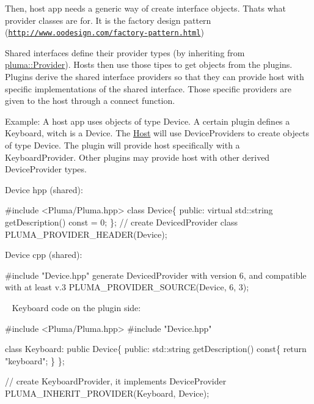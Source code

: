 Then, host app needs a generic way of create interface objects. That\textquotesingle{}s what provider classes are for. It is the factory design pattern (\href{http://www.oodesign.com/factory-pattern.html}{\tt http\+://www.\+oodesign.\+com/factory-\/pattern.\+html})

Shared interfaces define their provider types (by inheriting from \hyperlink{classpluma_1_1_provider}{pluma\+::\+Provider}). Hosts then use those tipes to get objects from the plugins. Plugins derive the shared interface providers so that they can provide host with specific implementations of the shared interface. Those specific providers are given to the host through a connect function.

Example\+: A host app uses objects of type Device. A certain plugin defines a Keyboard, witch is a Device. The \hyperlink{classpluma_1_1_host}{Host} will use Device\+Providers to create objects of type Device. The plugin will provide host specifically with a Keyboard\+Provider. Other plugins may provide host with other derived Device\+Provider types.

Device hpp (shared)\+: 
\begin{DoxyCode}
\textcolor{preprocessor}{#include <Pluma/Pluma.hpp>}
\textcolor{keyword}{class }Device\{
\textcolor{keyword}{public}:
    \textcolor{keyword}{virtual} std::string getDescription() \textcolor{keyword}{const} = 0;
\};
\textcolor{comment}{// create DevicedProvider class}
PLUMA\_PROVIDER\_HEADER(Device);
\end{DoxyCode}


Device cpp (shared)\+: 
\begin{DoxyCode}
\textcolor{preprocessor}{#include "Device.hpp"}
generate DevicedProvider with version 6, and compatible with at least v.3
PLUMA\_PROVIDER\_SOURCE(Device, 6, 3);
\end{DoxyCode}


~\newline
 Keyboard code on the plugin side\+: 
\begin{DoxyCode}
\textcolor{preprocessor}{#include <Pluma/Pluma.hpp>}
\textcolor{preprocessor}{#include "Device.hpp"}

\textcolor{keyword}{class }Keyboard: \textcolor{keyword}{public} Device\{
\textcolor{keyword}{public}:
    std::string getDescription()\textcolor{keyword}{ const}\{
        \textcolor{keywordflow}{return} \textcolor{stringliteral}{"keyboard"};
    \}
\};

\textcolor{comment}{// create KeyboardProvider, it implements DeviceProvider}
PLUMA\_INHERIT\_PROVIDER(Keyboard, Device);
\end{DoxyCode}


